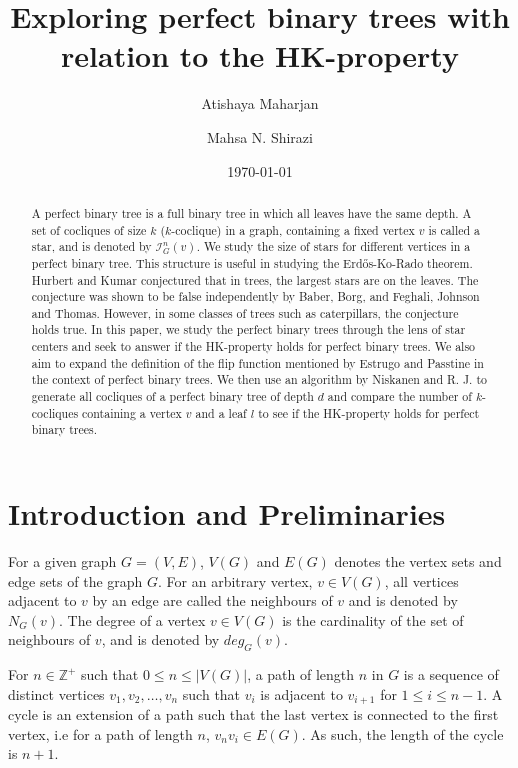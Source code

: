 \documentclass{amsart}
\title[]{Exploring perfect binary trees with relation to the HK-property}
\author[Atishaya Maharjan]{Atishaya Maharjan} \email[Atishaya Maharjan]{maharjaa@myumanitoba.ca}
\author[M.~N.~Shirazi]{Mahsa N. Shirazi} \email[M.~N.~Shirazi]{mahsa.nasrollahi@gmail.com}
\date{\today}
\theoremstyle{definition}
\begin{document}
\begin{abstract}
  A perfect binary tree is a full binary tree in which all leaves have the same depth. A set of cocliques of size $k$ ($k$-coclique) in a graph, containing a fixed vertex $v$ is called a star, and is denoted by $\mathcal{I}^n_G(v)$. We study the size of stars for different vertices in a perfect binary tree. This structure is useful in studying the Erd\H{o}s-Ko-Rado theorem. Hurbert and Kumar conjectured that in trees, the largest stars are on the leaves. The conjecture was shown to be false independently by Baber, Borg, and Feghali, Johnson and Thomas. However, in some classes of trees such as caterpillars, the conjecture holds true. In this paper, we study the perfect binary trees through the lens of star centers and seek to answer if the HK-property holds for perfect binary trees. We also aim to expand the definition of the flip function mentioned by Estrugo and Passtine in the context of perfect binary trees. We then use an algorithm by Niskanen and R. J. to generate all cocliques of a perfect binary tree of depth $d$ and compare the number of $k$-cocliques containing a vertex $v$ and a leaf $l$ to see if the HK-property holds for perfect binary trees.
\end{abstract}

\maketitle

\section{Introduction and Preliminaries}

For a given graph $G = (V,E)$, $V(G)$ and $E(G)$ denotes the vertex sets and edge sets of the graph $G$. For an arbitrary vertex, $v \in V(G)$, all vertices adjacent to $v$ by an edge are called the neighbours of $v$ and is denoted by $N_G(v)$. The degree of a vertex $v \in V(G)$ is the cardinality of the set of neighbours of $v$, and is denoted by $deg_G(v)$.

For $n \in \mathbb{Z^+}$ such that  $0 \leq n \leq |V(G)|$, a path of length $n$ in $G$ is a sequence of distinct vertices $v_1, v_2, \ldots, v_n$ such that $v_i$ is adjacent to $v_{i+1}$ for $1 \leq i \leq n-1$. A cycle is an extension of a path such that the last vertex is connected to the first vertex, i.e for a path of length $n$, $v_nv_i \in E(G)$. As such, the length of the cycle is $n + 1$.
\end{document}
